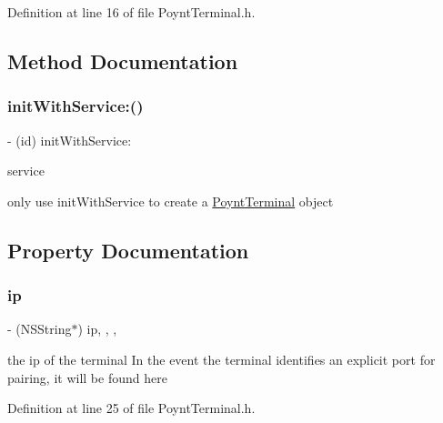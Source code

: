 Definition at line 16 of file Poynt\+Terminal.\+h.



\subsection{Method Documentation}
\hypertarget{interface_poynt_terminal_a85d039f4fe918b4ab91b90c1bac883f1}{}\label{interface_poynt_terminal_a85d039f4fe918b4ab91b90c1bac883f1} 
\subsubsection{\texorpdfstring{init\+With\+Service\+:()}{initWithService:()}}
{\footnotesize\ttfamily -\/ (id) init\+With\+Service\+: \begin{DoxyParamCaption}\item[{(N\+S\+Net\+Service $\ast$)}]{service }\end{DoxyParamCaption}}



only use init\+With\+Service to create a \hyperlink{interface_poynt_terminal}{Poynt\+Terminal} object 



\subsection{Property Documentation}
\hypertarget{interface_poynt_terminal_ab18eca4fc399814b2e86f54006b1e474}{}\label{interface_poynt_terminal_ab18eca4fc399814b2e86f54006b1e474} 
\subsubsection{\texorpdfstring{ip}{ip}}
{\footnotesize\ttfamily -\/ (N\+S\+String$\ast$) ip\hspace{0.3cm}{\ttfamily [read]}, {\ttfamily [write]}, {\ttfamily [nonatomic]}, {\ttfamily [strong]}}



the ip of the terminal  In the event the terminal identifies an explicit port for pairing, it will be found here 



Definition at line 25 of file Poynt\+Terminal.\+h.


